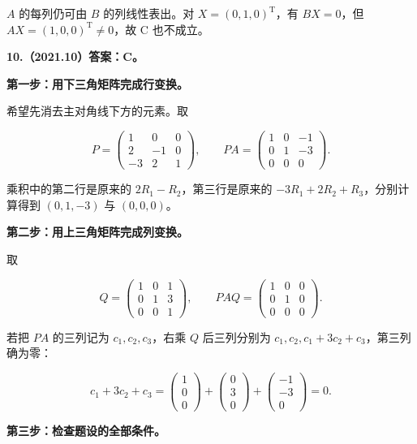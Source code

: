 \documentclass[UTF8,11pt,fontset=windows]{ctexart}
\begin{document}
$A$ 的每列仍可由 $B$ 的列线性表出。对 $X=(0,1,0)^{\mathrm T}$，有 $BX=0$，但 $AX=(1,0,0)^{\mathrm T}\ne0$，故 C 也不成立。

\clearpage

\textbf{10.（2021.10）答案：C。}

\textbf{第一步：用下三角矩阵完成行变换。}

希望先消去主对角线下方的元素。取

$$
P=\begin{pmatrix}1&0&0\\2&-1&0\\-3&2&1\end{pmatrix},
\qquad PA=\begin{pmatrix}1&0&-1\\0&1&-3\\0&0&0\end{pmatrix}.
$$

乘积中的第二行是原来的 $2R_1-R_2$，第三行是原来的 $-3R_1+2R_2+R_3$，分别计算得到 $(0,1,-3)$ 与 $(0,0,0)$。

\textbf{第二步：用上三角矩阵完成列变换。}

取

$$
Q=\begin{pmatrix}1&0&1\\0&1&3\\0&0&1\end{pmatrix},
\qquad PAQ=\begin{pmatrix}1&0&0\\0&1&0\\0&0&0\end{pmatrix}.
$$

若把 $PA$ 的三列记为 $c_1,c_2,c_3$，右乘 $Q$ 后三列分别为 $c_1,c_2,c_1+3c_2+c_3$，第三列确为零：

$$
c_1+3c_2+c_3
=\begin{pmatrix}1\\0\\0\end{pmatrix}
+\begin{pmatrix}0\\3\\0\end{pmatrix}
+\begin{pmatrix}-1\\-3\\0\end{pmatrix}=0.
$$

\textbf{第三步：检查题设的全部条件。}
\end{document}
